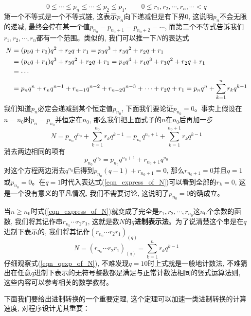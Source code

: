 \begin{equation}
    0\leq\cdots\leq p_n\leq\cdots\leq p_2\leq p_1,\qquad 0\leq r_1,r_2,\cdots,r_n,\cdots< q
\end{equation}
第一个不等式是一个不等式链, 这表示$p_n$向下递减但是有下界0, 这说明$p_n$不会无限的递减, 最终会停在某一个值$p_{n_0}=p_{n_0+1}=p_{n_0+2}=\cdots$, 而第二个不等式告诉我们$r_1,r_2,\cdots,r_n$都有一个范围。类似的, 我们可以推一下$N$的表达式
\begin{align}
        N&=(p_3q+r_3)q^2+r_2q+r_1=p_3q^3+r_3q^2+r_2q+r_1\notag\\
        &=(p_4q+r_4)q^3+r_3q^2+r_2q+r_1=p_4q^4+r_4q^3+r_3q^2+r_2q+r_1\notag\\
        &=\cdots\notag\\
        &=p_nq^n+r_nq^{n-1}+r_{n-1}q^{n-2}+r_{n-2}q^{n-3}+\cdots+r_2q+r_1=p_nq^n+\sum_{k=1}^n r_kq^{k-1}\label{eqn_express_of_N}
\end{align}
我们知道$p_n$必定会递减到某个恒定值$p_{n_0}$, 下面我们要论证$p_{n_0}=0$。事实上假设在$n=n_0$时$p_n=p_{n_0}$并恒定在$n_0$, 那么我们把上面式子的$n$在$n_0$后再加一步
$$N=p_{n_0}q^{n_0}+\sum_{k=1}^{n_0}r_kq^{k-1}=p_{n_0}q^{n_0+1}+\sum_{k=1}^{n_0+1}r_kq^{k-1}$$
消去两边相同的项有
$$p_{n_0}q^{n_0}=p_{n_0}q^{n_0+1}+r_{n_0+1}q^{n_0}$$
对这个方程两边消去$q^{n_0}$后得到$p_{n_0}(q-1)+r_{n_0+1}=0$, 那么$r_{n_0+1}=0$并且$q=1$或$p_{n_0}=0$。在$q=1$时代入表达式(\ref{eqn_express_of_N})可以看到全部的$r_{k}=0$, 这是一个没有意义的平凡情况, 我们不需要讨论, 这说明了$p_{n_0}=0$的确成立。
\par 当$n\geq n_0$时式(\ref{eqn_express_of_N})就变成了完全是$r_1,r_2,\cdots,r_{n_0}$这$n_0$个余数的函数, 我们将其记作串$r_{n_0}\cdots r_2r_1$, 这就是数$N$的\textbf{$q$进制表示法}。为了说清楚这个串是在$q$进制下表示的, 我们将其记作$(r_{n_0}\cdots r_2r_1)_{(q)}$
\begin{equation}\label{eqn_qexp_of_N}
    N=(r_{n_0}\cdots r_2r_1)_{(q)}=\sum_{k=1}^n r_kq^{k-1}
\end{equation}
仔细观察式(\ref{eqn_qexp_of_N}), 不难发现$q=10$时上式就是一般地计数法, 不难猜出在任意$q$进制下表示的无符号整数都是满足与正常计数法相同的竖式运算法则, 这些内容可以参考相关的数学教材。
\par 下面我们要给出进制转换的一个重要定理, 这个定理可以加速一类进制转换的计算速度, 对程序设计尤其重要：
